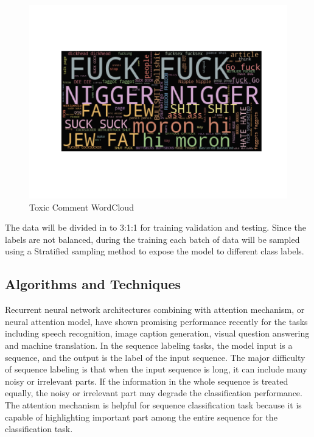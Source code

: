 \documentclass{article}
\begin{document}
    \begin{figure}[!h]
        \centering
        \includegraphics[scale=0.3]{figures/wordcloud.pdf}
        \caption{Toxic Comment WordCloud}
        \label{fig:wordcloud}
    \end{figure}


    The data will be divided in to 3:1:1 for training validation and testing. Since the labels are not balanced, during the training each batch of data will be sampled using a Stratified sampling method to expose the model to different class labels.

    \subsection{Algorithms and Techniques}

    Recurrent neural network architectures combining with attention mechanism,
    or neural attention model, have shown promising performance recently for
    the tasks including speech recognition, image caption generation,
    visual question answering and machine translation. 
    In the sequence labeling tasks,
    the model input is a sequence, and the output is the label of the
    input sequence. The major difficulty of sequence labeling is that when
    the input sequence is long, it can include many noisy or irrelevant parts.
    If the information in the whole sequence is treated equally, the noisy or
    irrelevant part may degrade the classification performance.
    The attention mechanism is helpful for sequence classification task because
    it is capable of highlighting important part among the entire sequence for
    the classification task.
\end{document}
